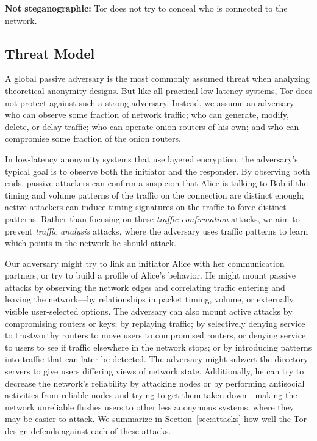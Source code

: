 \documentclass[twocolumn]{article}
\begin{document}
\textbf{Not steganographic:} Tor does not try to conceal who is connected
to the network.

\subsection{Threat Model}
\label{subsec:threat-model}

A global passive adversary is the most commonly assumed threat when
analyzing theoretical anonymity designs. But like all practical
low-latency systems, Tor does not protect against such a strong
adversary. Instead, we assume an adversary who can observe some fraction
of network traffic; who can generate, modify, delete, or delay
traffic;  who can operate onion routers of his own; and who can
compromise some fraction of the onion routers.

In low-latency anonymity systems that use layered encryption, the
adversary's typical goal is to observe both the initiator and the
responder. By observing both ends, passive attackers can confirm a
suspicion that Alice is
talking to Bob if the timing and volume patterns of the traffic on the
connection are distinct enough; active attackers can induce timing
signatures on the traffic to force distinct patterns. Rather
than focusing on these \emph{traffic confirmation} attacks,
we aim to prevent \emph{traffic
analysis} attacks, where the adversary uses traffic patterns to learn
which points in the network he should attack.

Our adversary might try to link an initiator Alice with her
communication partners, or try to build a profile of Alice's
behavior. He might mount passive attacks by observing the network edges
and correlating traffic entering and leaving the network---by
relationships in packet timing, volume, or externally visible
user-selected
options. The adversary can also mount active attacks by compromising
routers or keys; by replaying traffic; by selectively denying service
to trustworthy routers to move users to
compromised routers, or denying service to users to see if traffic
elsewhere in the
network stops; or by introducing patterns into traffic that can later be
detected. The adversary might subvert the directory servers to give users
differing views of network state. Additionally, he can try to decrease
the network's reliability by attacking nodes or by performing antisocial
activities from reliable nodes and trying to get them taken down---making
the network unreliable flushes users to other less anonymous
systems, where they may be easier to attack. We summarize
in Section~\ref{sec:attacks} how well the Tor design defends against
each of these attacks.
\end{document}
